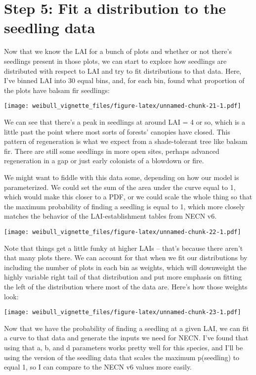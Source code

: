\documentclass[
]{article}
\begin{document}
\section{Step 5: Fit a distribution to the seedling
data}\label{step-5-fit-a-distribution-to-the-seedling-data}

Now that we know the LAI for a bunch of plots and whether or not there's
seedlings present in those plots, we can start to explore how seedlings
are distributed with respect to LAI and try to fit distributions to that
data. Here, I've binned LAI into 30 equal bins, and, for each bin, found
what proportion of the plots have balsam fir seedlings:

\texttt{[image: weibull\_vignette\_files/figure-latex/unnamed-chunk-21-1.pdf]}

We can see that there's a peak in seedlings at around LAI = 4 or so,
which is a little past the point where most sorts of forests' canopies
have closed. This pattern of regeneration is what we expect from a
shade-tolerant tree like balsam fir. There are still some seedlings in
more open sites, perhaps advanced regeneration in a gap or just early
colonists of a blowdown or fire.

We might want to fiddle with this data some, depending on how our model
is parameterized. We could set the sum of the area under the curve equal
to 1, which would make this closer to a PDF, or we could scale the whole
thing so that the maximum probability of finding a seedling is equal to
1, which more closely matches the behavior of the LAI-establishment
tables from NECN v6.

\texttt{[image: weibull\_vignette\_files/figure-latex/unnamed-chunk-22-1.pdf]}

Note that things get a little funky at higher LAIs -- that's because
there aren't that many plots there. We can account for that when we fit
our distributions by including the number of plots in each bin as
weights, which will downweight the highly variable right tail of that
distribution and put more emphasis on fitting the left of the
distribution where most of the data are. Here's how those weights look:

\texttt{[image: weibull\_vignette\_files/figure-latex/unnamed-chunk-23-1.pdf]}

Now that we have the probability of finding a seedling at a given LAI,
we can fit a curve to that data and generate the inputs we need for
NECN. I've found that using that a, b, and d parameters works pretty
well for this species, and I'll be using the version of the seedling
data that scales the maximum p(seedling) to equal 1, so I can compare to
the NECN v6 values more easily.
\end{document}
